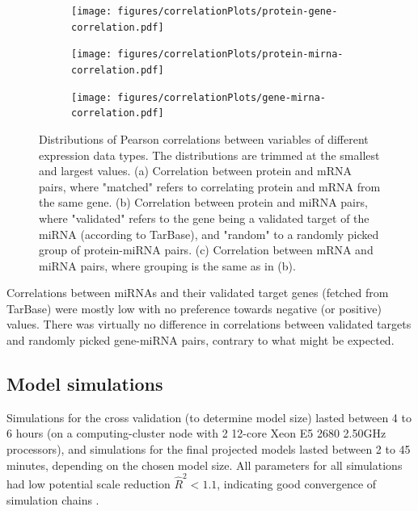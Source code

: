 \begin{figure}[!h]
  \centering
  \begin{subfigure}{.45\textwidth}
    \subcaption{ \label{fig:protein-gene-cor}}
    \centering
    \texttt{[image: figures/correlationPlots/protein-gene-correlation.pdf]}
  \end{subfigure}
  \begin{subfigure}{.45\textwidth}
    \subcaption{ \label{fig:protein-mirna-cor}}
    \centering
    \texttt{[image: figures/correlationPlots/protein-mirna-correlation.pdf]}
  \end{subfigure}
  \begin{subfigure}{.45\textwidth}
    \subcaption{ \label{fig:gene-mirna-cor}}
    \texttt{[image: figures/correlationPlots/gene-mirna-correlation.pdf]}
  \end{subfigure}

  \caption{Distributions of Pearson correlations between variables of different expression data types.
  The distributions are trimmed at the smallest and largest values.
  (a) Correlation between protein and mRNA pairs, where "matched" refers to correlating
  protein and mRNA from the same gene.
  (b) Correlation between protein and miRNA pairs, where "validated" refers to the gene
  being a validated target of the miRNA (according to TarBase),
  and "random" to a randomly picked group of protein-miRNA pairs.
  (c) Correlation between mRNA and miRNA pairs,
  where grouping is the same as in (b).}
  \label{fig:correlations}
\end{figure}

Correlations between miRNAs and their validated target genes (fetched from
TarBase) were mostly low with no preference towards negative (or positive)
values. There was virtually no difference in correlations between validated
targets and randomly picked gene-miRNA pairs, contrary to what might be
expected.




\subsection*{Model simulations}

Simulations for the cross validation (to determine model size) lasted
between 4 to 6 hours (on a computing-cluster node with 2 12-core Xeon E5 2680
2.50GHz processors), and simulations for the final projected models lasted
between 2 to 45 minutes, depending on the chosen model size. All parameters for all
simulations had low potential scale reduction $\hat{R}^2 < 1.1$, indicating
good convergence of simulation chains \citep{Gelman2013}.

